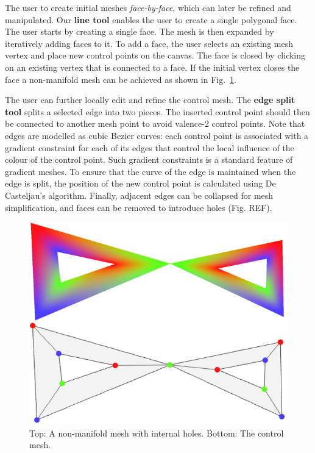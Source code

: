 \documentclass{egpubl}
\begin{document}
	The user to create initial meshes \textit{face-by-face}, which can later be refined and manipulated. Our \textbf{line tool} enables the user to create a single polygonal face. The user starts by creating a single face. The mesh is then expanded by iteratively adding faces to it. To add a face, the user selects an existing mesh vertex and place new control points on the canvas. The face is closed by clicking on an existing vertex that is connected to a face. If the initial vertex closes the face a non-manifold mesh can be achieved as shown in Fig.~\ref{fig:nonManifoldHoleMesh}.
	
	The user can further locally edit and refine the control mesh. The \textbf{edge split tool} splits a selected edge into two pieces. The inserted control point should then be connected to another mesh point to avoid valence-2 control points. Note that edges are modelled as cubic Bezier curves: each control point is associated with a gradient constraint for each of its edges that control the local influence of the colour of the control point. Such gradient constraints is a standard feature of gradient meshes. To ensure that the curve of the edge is maintained when the edge is split, the position of the new control point is calculated using De Casteljau's algorithm. Finally, adjacent edges can be collapsed for mesh simplification, and faces can be removed to introduce holes (Fig. REF).
	
	\begin{figure}[t]
		\centering
		\includegraphics[height=0.25\textheight]{HoleAndNonManifoldMesh.png}
		\caption{Top: A non-manifold mesh with internal holes. Bottom: The control mesh.}
		\label{fig:nonManifoldHoleMesh}
	\end{figure}
	
\end{document}
